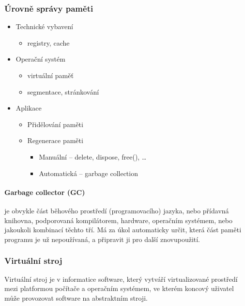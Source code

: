 \documentclass[10pt,a4paper]{article}
\begin{document}
\subsubsection{Úrovně správy paměti}

\begin{itemize}
\item Technické vybavení
\begin{itemize}
\item registry, cache
\end{itemize}
\item Operační systém
\begin{itemize}
\item virtuální paměť
\item segmentace, stránkování
\end{itemize}
\item Aplikace
\begin{itemize}
\item Přidělování paměti
\item Regenerace paměti
\begin{itemize}
\item Manuální – delete, dispose, free(), …
\item Automatická – garbage collection
\end{itemize}
\end{itemize}
\end{itemize}
\paragraph{Garbage collector (GC)} je obvykle část běhového prostředí (programovacího) jazyka, nebo přídavná knihovna, podporovaná kompilátorem, hardware, operačním systémem, nebo jakoukoli kombinací těchto tří. Má za úkol automaticky určit, která část paměti programu je už nepoužívaná, a připravit ji pro další znovupoužití.
\subsubsection{Virtuální stroj}
Virtuální stroj je v informatice software, který vytváří virtualizované prostředí mezi platformou počítače a operačním systémem, ve kterém koncový uživatel může provozovat software na abstraktním stroji.
\end{document}
